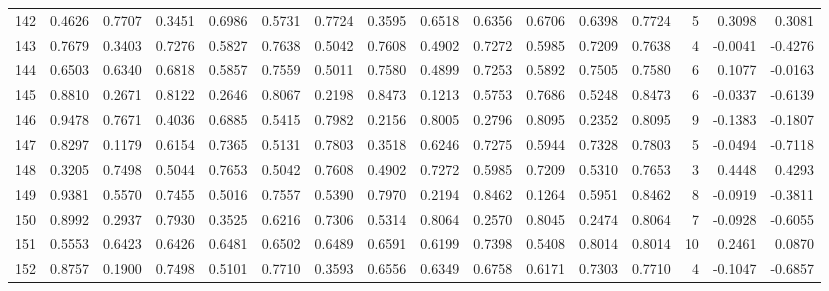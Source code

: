 \begin{tabular}{lrrrrrrrrrrrrrrr}
142 &      0.4626 &  0.7707 &  0.3451 &  0.6986 &  0.5731 &  0.7724 &  0.3595 &  0.6518 &  0.6356 &  0.6706 &   0.6398 &     0.7724 &      5 &                    0.3098 &                     0.3081 \\
143 &      0.7679 &  0.3403 &  0.7276 &  0.5827 &  0.7638 &  0.5042 &  0.7608 &  0.4902 &  0.7272 &  0.5985 &   0.7209 &     0.7638 &      4 &                   -0.0041 &                    -0.4276 \\
144 &      0.6503 &  0.6340 &  0.6818 &  0.5857 &  0.7559 &  0.5011 &  0.7580 &  0.4899 &  0.7253 &  0.5892 &   0.7505 &     0.7580 &      6 &                    0.1077 &                    -0.0163 \\
145 &      0.8810 &  0.2671 &  0.8122 &  0.2646 &  0.8067 &  0.2198 &  0.8473 &  0.1213 &  0.5753 &  0.7686 &   0.5248 &     0.8473 &      6 &                   -0.0337 &                    -0.6139 \\
146 &      0.9478 &  0.7671 &  0.4036 &  0.6885 &  0.5415 &  0.7982 &  0.2156 &  0.8005 &  0.2796 &  0.8095 &   0.2352 &     0.8095 &      9 &                   -0.1383 &                    -0.1807 \\
147 &      0.8297 &  0.1179 &  0.6154 &  0.7365 &  0.5131 &  0.7803 &  0.3518 &  0.6246 &  0.7275 &  0.5944 &   0.7328 &     0.7803 &      5 &                   -0.0494 &                    -0.7118 \\
148 &      0.3205 &  0.7498 &  0.5044 &  0.7653 &  0.5042 &  0.7608 &  0.4902 &  0.7272 &  0.5985 &  0.7209 &   0.5310 &     0.7653 &      3 &                    0.4448 &                     0.4293 \\
149 &      0.9381 &  0.5570 &  0.7455 &  0.5016 &  0.7557 &  0.5390 &  0.7970 &  0.2194 &  0.8462 &  0.1264 &   0.5951 &     0.8462 &      8 &                   -0.0919 &                    -0.3811 \\
150 &      0.8992 &  0.2937 &  0.7930 &  0.3525 &  0.6216 &  0.7306 &  0.5314 &  0.8064 &  0.2570 &  0.8045 &   0.2474 &     0.8064 &      7 &                   -0.0928 &                    -0.6055 \\
151 &      0.5553 &  0.6423 &  0.6426 &  0.6481 &  0.6502 &  0.6489 &  0.6591 &  0.6199 &  0.7398 &  0.5408 &   0.8014 &     0.8014 &     10 &                    0.2461 &                     0.0870 \\
152 &      0.8757 &  0.1900 &  0.7498 &  0.5101 &  0.7710 &  0.3593 &  0.6556 &  0.6349 &  0.6758 &  0.6171 &   0.7303 &     0.7710 &      4 &                   -0.1047 &                    -0.6857 \\

\end{tabular}
